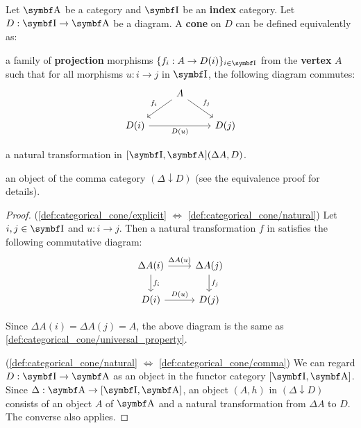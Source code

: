 \begin{definition}\label{def:categorical_cone}\cite[definition 5.1.19(a)]{Leinster2014}
  Let \( \Bold A \) be a category and \( \Bold I \) be an \textbf{index} category. Let \( D: \Bold I \to \Bold A \) be a diagram. A \textbf{cone} on \( D \) can be defined equivalently as:

  \begin{defenum}
     a family of \textbf{projection} morphisms \( \{ f_i: A \to D(i) \}_{i \in \Bold I} \) from the \textbf{vertex} \( A \) such that for all morphisms \( u: i \to j \) in \( \Bold I \), the following diagram commutes:
    \begin{equation}\label{def:categorical_cone/universal_property}
      \begin{tikzcd}
        & A \arrow[ld, "f_i"'] \arrow[rd, "f_j"] & \\
        D(i) \arrow[rr, "D(u)"'] & & D(j)
      \end{tikzcd}
    \end{equation}

     a natural transformation in \( [\Bold I, \Bold A](\Delta A, D) \).

     an object of the comma category \( (\Delta \downarrow D) \) (see the equivalence proof for details).
  \end{defenum}
\end{definition}
\begin{proof}
  (\ref{def:categorical_cone/explicit} \( \iff \) \ref{def:categorical_cone/natural}) Let \( i, j \in \Bold I \) and \( u: i \to j \). Then a natural transformation \( f \) in  satisfies the following commutative diagram:
  \begin{equation*}
    \begin{tikzcd}
      \Delta A(i) \arrow[r, "\Delta A(u)"] \arrow[d, "f_i"] & \Delta A(j) \arrow[d, "f_j"] \\
      D(i) \arrow[r, "D(u)"]                       & D(j)
    \end{tikzcd}
  \end{equation*}

  Since \( \Delta A(i) = \Delta A(j) = A \), the above diagram is the same as \cref{def:categorical_cone/universal_property}.

  (\ref{def:categorical_cone/natural} \( \iff \) \ref{def:categorical_cone/comma}) We can regard \( D: \Bold I \to \Bold A \) as an object in the functor category \( [\Bold I, \Bold A] \). Since \( \Delta: \Bold A \to [\Bold I, \Bold A] \), an object \( (A, h) \) in \( (\Delta \downarrow D) \) consists of an object \( A \) of \( \Bold A \) and a natural transformation from \( \Delta A \) to \( D \). The converse also applies.
\end{proof}

